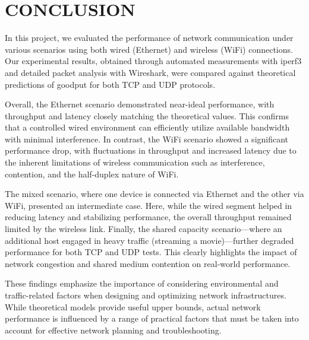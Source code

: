 
\section{CONCLUSION} \label{sec:conclusion}

In this project, we evaluated the performance of network communication under various scenarios using both wired (Ethernet) and wireless (WiFi) connections. Our experimental results, obtained through automated measurements with iperf3 and detailed packet analysis with Wireshark, were compared against theoretical predictions of goodput for both TCP and UDP protocols.

Overall, the Ethernet scenario demonstrated near-ideal performance, with throughput and latency closely matching the theoretical values. This confirms that a controlled wired environment can efficiently utilize available bandwidth with minimal interference. In contrast, the WiFi scenario showed a significant performance drop, with fluctuations in throughput and increased latency due to the inherent limitations of wireless communication such as interference, contention, and the half-duplex nature of WiFi.

The mixed scenario, where one device is connected via Ethernet and the other via WiFi, presented an intermediate case. Here, while the wired segment helped in reducing latency and stabilizing performance, the overall throughput remained limited by the wireless link. Finally, the shared capacity scenario—where an additional host engaged in heavy traffic (streaming a movie)—further degraded performance for both TCP and UDP tests. This clearly highlights the impact of network congestion and shared medium contention on real-world performance.

These findings emphasize the importance of considering environmental and traffic-related factors when designing and optimizing network infrastructures. While theoretical models provide useful upper bounds, actual network performance is influenced by a range of practical factors that must be taken into account for effective network planning and troubleshooting.
